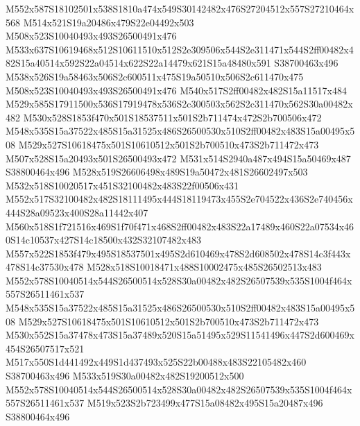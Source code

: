 \documentclass{article}
\begin{document}
\begin{multicols}{2}
M552x587S18102501x538S1810a474x549S30142482x476S27204512x557S27210464x568 M514x521S19a20486x479S22e04492x503 M508x523S10040493x493S26500491x476 M533x637S10619468x512S10611510x512S2e309506x544S2e311471x544S2ff00482x482S15a40514x592S22a04514x622S22a14479x621S15a48480x591 S38700463x496 M538x526S19a58463x506S2c600511x475S19a50510x506S2c611470x475 M508x523S10040493x493S26500491x476 M540x517S2ff00482x482S15a11517x484 M529x585S17911500x536S17919478x536S2c300503x562S2c311470x562S30a00482x482 M530x528S1853f470x501S18537511x501S2b711474x472S2b700506x472 M548x535S15a37522x485S15a31525x486S26500530x510S2ff00482x483S15a00495x508 M529x527S10618475x501S10610512x501S2b700510x473S2b711472x473 M507x528S15a20493x501S26500493x472 M531x514S2940a487x494S15a50469x487 S38800464x496 M528x519S26606498x489S19a50472x481S26602497x503 M532x518S10020517x451S32100482x483S22f00506x431 M552x517S32100482x482S18111495x444S18119473x455S2e704522x436S2e740456x444S28a09523x400S28a11442x407 M560x518S1f721516x469S1f70f471x468S2ff00482x483S22a17489x460S22a07534x460S14c10537x427S14c18500x432S32107482x483 M557x522S1853f479x495S18537501x495S2d610469x478S2d608502x478S14c3f443x478S14c37530x478 M528x518S10018471x488S10002475x485S26502513x483 M552x578S10040514x544S26500514x528S30a00482x482S26507539x535S1004f464x557S26511461x537 M548x535S15a37522x485S15a31525x486S26500530x510S2ff00482x483S15a00495x508 M529x527S10618475x501S10610512x501S2b700510x473S2b711472x473 M530x552S15a37478x473S15a37489x520S15a51495x529S11541496x447S2d600469x454S26507517x521 M517x550S1d441492x449S1d437493x525S22b00488x483S22105482x460 S38700463x496 M533x519S30a00482x482S19200512x500 M552x578S10040514x544S26500514x528S30a00482x482S26507539x535S1004f464x557S26511461x537 M519x523S2b723499x477S15a08482x495S15a20487x496 S38800464x496






\end{multicols}
\end{document}

